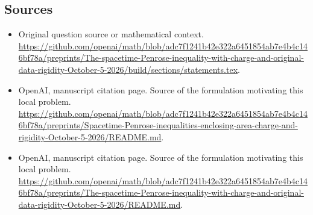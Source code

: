 \documentclass[11pt]{article}
\begin{document}
\subsection{Sources}
\begin{itemize}
\item[S1] Original question source or mathematical context.
\url{https://github.com/openai/math/blob/adc7f1241b42e322a6451854ab7e4b4c146bf78a/preprints/The-spacetime-Penrose-inequality-with-charge-and-original-data-rigidity-October-5-2026/build/sections/statements.tex}.
\item[S2] OpenAI, manuscript citation page. Source of the formulation motivating this local problem.
\url{https://github.com/openai/math/blob/adc7f1241b42e322a6451854ab7e4b4c146bf78a/preprints/Spacetime-Penrose-inequalities-enclosing-area-charge-and-rigidity-October-5-2026/README.md}.
\item[S3] OpenAI, manuscript citation page. Source of the formulation motivating this local problem.
\url{https://github.com/openai/math/blob/adc7f1241b42e322a6451854ab7e4b4c146bf78a/preprints/The-spacetime-Penrose-inequality-with-charge-and-original-data-rigidity-October-5-2026/README.md}.
\end{itemize}
\end{document}
